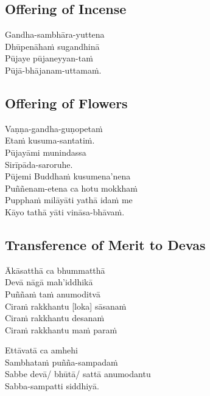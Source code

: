 \clearpage

\subsection{Offering of Incense}


\begin{paritta}
Gandha-sambhāra-yuttena\\
Dhūpenāhaṁ sugandhinā\\
Pūjaye pūjaneyyan-taṁ\\
Pūjā-bhājanam-uttamaṁ.
\end{paritta}

\subsection{Offering of Flowers}


\begin{paritta}
Vaṇṇa-gandha-guṇopetaṁ\\
Etaṁ kusuma-santatiṁ.\\
Pūjayāmi munindassa\\
Sirīpāda-saroruhe.\\
Pūjemi Buddhaṁ kusumena'nena\\
Puññenam-etena ca hotu mokkhaṁ\\
Pupphaṁ milāyāti yathā idaṁ me\\
Kāyo tathā yāti vināsa-bhāvaṁ.
\end{paritta}

\subsection{Transference of Merit to Devas}


\begin{paritta}
Ākāsatthā ca bhummatthā\\
Devā nāgā mah'iddhikā\\
Puññaṁ taṁ anumoditvā\\
Ciraṁ rakkhantu [loka] sāsanaṁ\\
Ciraṁ rakkhantu desanaṁ\\
Ciraṁ rakkhantu maṁ paraṁ
\end{paritta}

\begin{paritta}
Ettāvatā ca amhehi\\
Sambhataṁ puñña-sampadaṁ\\
Sabbe devā/ bhūtā/ sattā anumodantu\\
Sabba-sampatti siddhiyā.
\end{paritta}

